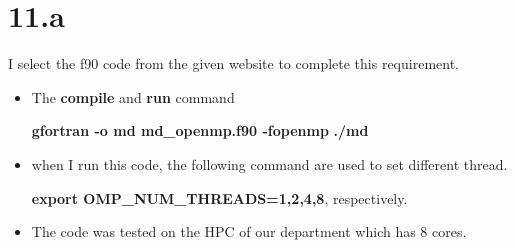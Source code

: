 \documentclass{article}
\begin{document}
\section*{11.a}
I select the f90 code from the given website to complete this requirement.
\begin{itemize}
\item The \textbf{compile} and \textbf{run} command

\textbf{ gfortran  -o  md   md\_openmp.f90 -fopenmp}
\textbf{ ./md  }

\item when I run this code,  the following command are used to set different thread.

 \textbf{export OMP\_NUM\_THREADS=1,2,4,8}, respectively.
\item The code was tested on the HPC of our department which has 8 cores.

\end{itemize}
\end{document}
